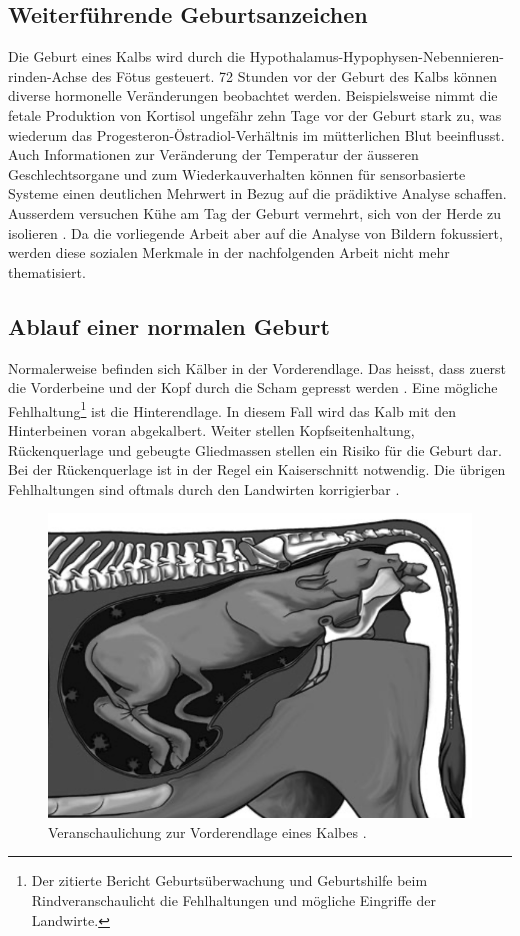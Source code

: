 \subsection{Weiterführende Geburtsanzeichen}
Die Geburt eines Kalbs wird durch die Hypothalamus-Hypophysen-Nebennieren-rinden-Achse des Fötus gesteuert. 72 Stunden vor der Geburt des Kalbs können diverse hormonelle Veränderungen beobachtet werden. Beispielsweise nimmt die fetale Produktion von Kortisol ungefähr zehn Tage vor der Geburt stark zu, was wiederum das Progesteron-Östradiol-Verhältnis im mütterlichen Blut beeinflusst. Auch Informationen zur Veränderung der Temperatur der äusseren Geschlechtsorgane und zum Wiederkauverhalten können für sensorbasierte Systeme einen deutlichen Mehrwert in Bezug auf die prädiktive Analyse schaffen. Ausserdem versuchen Kühe am Tag der Geburt vermehrt, sich von der Herde zu isolieren \citep[S. 349-352]{Saint-Dizier2015}. 
Da die vorliegende Arbeit aber auf die Analyse von Bildern fokussiert, werden diese sozialen Merkmale in der nachfolgenden Arbeit nicht mehr thematisiert. 
\subsection{Ablauf einer normalen Geburt}
Normalerweise befinden sich Kälber in der Vorderendlage. Das heisst, dass zuerst die Vorderbeine und der Kopf durch die Scham gepresst werden \citep{Muller2020}. Eine mögliche Fehlhaltung\footnote{Der zitierte Bericht \flqq Geburtsüberwachung und Geburtshilfe beim Rind\frqq veranschaulicht die Fehlhaltungen und mögliche Eingriffe der Landwirte.} ist die Hinterendlage. In diesem Fall wird das Kalb mit den Hinterbeinen voran abgekalbert. Weiter stellen Kopfseitenhaltung, Rückenquerlage und gebeugte Gliedmassen stellen ein Risiko für die Geburt dar. Bei der Rückenquerlage ist in der Regel ein Kaiserschnitt notwendig. Die übrigen Fehlhaltungen sind oftmals durch den Landwirten korrigierbar \citep[S. 17, 24-26]{Traulsen2013}.

\begin{figure}[H]
	\center
	\includegraphics[scale=.45]{Grafiken/vorderendlage.png}
	\caption{Veranschaulichung zur Vorderendlage eines Kalbes \citep[S. 17]{Traulsen2013}.}
	\label{fig: Schwanzhebung}
\end{figure}

